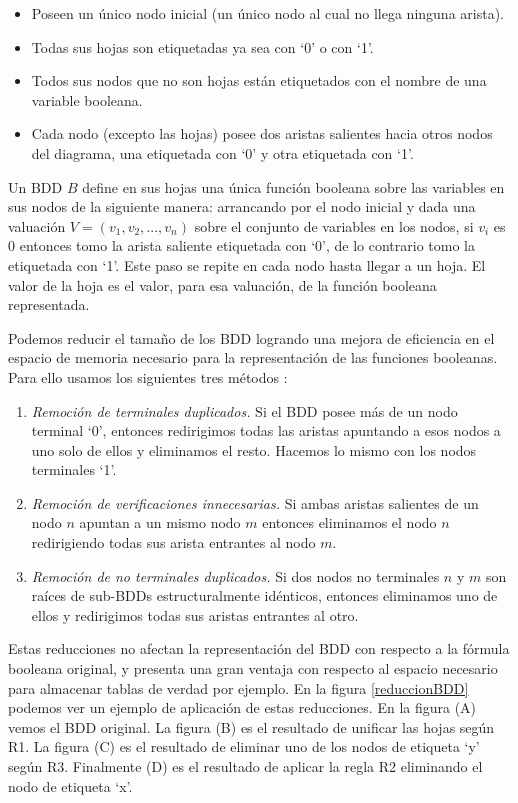 \documentclass[titlepage, 12pt]{book}
\begin{document}
\begin{itemize}
\item Poseen un \'unico nodo inicial (un \'unico nodo al cual no llega ninguna arista).
\item Todas sus hojas son etiquetadas ya sea con `0' o con `1'.
\item Todos sus nodos que no son hojas est\'an etiquetados con el nombre de una variable booleana.
\item Cada nodo (excepto las hojas) posee dos aristas salientes hacia otros nodos del diagrama, una etiquetada con `0' y otra etiquetada con `1'.
\end{itemize}

Un BDD $B$ define en sus hojas una \'unica funci\'on booleana sobre las variables en sus nodos de la siguiente manera: arrancando por el nodo inicial y dada una valuaci\'on $V=(v_1,v_2,...,v_n)$ sobre el conjunto de variables en los nodos, si $v_i$ es $0$ entonces tomo la arista saliente etiquetada con `0', de lo contrario tomo la etiquetada con `1'. Este paso se repite en cada nodo hasta llegar a un hoja. El valor de la hoja es el valor, para esa valuaci\'on, de la funci\'on booleana representada.

Podemos reducir el tama\~no de los BDD logrando una mejora de eficiencia en el espacio de memoria necesario para la representaci\'on de las funciones booleanas. Para ello usamos los siguientes tres m\'etodos \cite{Huth}:

\begin{enumerate}[R1--]
\item \textit{Remoci\'on de terminales duplicados.} Si el BDD posee m\'as de un nodo terminal `0', entonces redirigimos todas las aristas apuntando a esos nodos a uno solo de ellos y eliminamos el resto. Hacemos lo mismo con los nodos terminales `1'.
\item \textit{Remoci\'on de verificaciones innecesarias.} Si ambas aristas salientes de un nodo $n$ apuntan a un mismo nodo $m$ entonces eliminamos el nodo $n$ redirigiendo todas sus arista entrantes al nodo $m$.
\item \textit{Remoci\'on de no terminales duplicados.} Si dos nodos no terminales $n$ y $m$ son ra\'ices de sub-BDDs estructuralmente id\'enticos, entonces eliminamos uno de ellos y redirigimos todas sus aristas entrantes al otro.
\end{enumerate}

Estas reducciones no afectan la representaci\'on del BDD con respecto a la f\'ormula booleana original, y presenta una gran ventaja con respecto al espacio necesario para almacenar tablas de verdad por ejemplo. En la figura \ref{reduccionBDD} podemos ver un ejemplo de aplicaci\'on de estas reducciones. En la figura (A) vemos el BDD original. La figura (B) es el resultado de unificar las hojas seg\'un R1. La figura (C) es el resultado de eliminar uno de los nodos de etiqueta `y' seg\'un R3. Finalmente (D) es el resultado de aplicar la regla R2 eliminando el nodo de etiqueta `x'.
\end{document}
